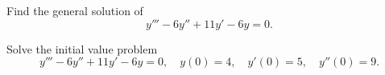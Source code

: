 \begin{example}
  \label{example:9.2.1} \rm \mbox{}
  \newline
  \begin{alist}
    \item %
    Find the general solution of
    \begin{equation}
      \label{eq:9.2.3}y'''-6y''+11y'-6y=0.
    \end{equation}

    \item %
    Solve the initial value problem
    \begin{equation}
      \label{eq:9.2.4}y'''-6y''+11y'-6y=0,\quad y(0)=4,\quad y'(0)=5,\quad y''(0)=9.
    \end{equation}
  \end{alist}
\end{example}

